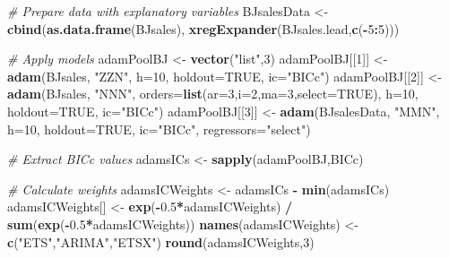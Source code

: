 \documentclass[]{book}
\newenvironment{Shaded}{\begin{snugshade}}{\end{snugshade}}
\newcommand{\CommentTok}[1]{\textcolor[rgb]{0.56,0.35,0.01}{\textit{#1}}}
\newcommand{\DataTypeTok}[1]{\textcolor[rgb]{0.13,0.29,0.53}{#1}}
\newcommand{\DecValTok}[1]{\textcolor[rgb]{0.00,0.00,0.81}{#1}}
\newcommand{\FloatTok}[1]{\textcolor[rgb]{0.00,0.00,0.81}{#1}}
\newcommand{\KeywordTok}[1]{\textcolor[rgb]{0.13,0.29,0.53}{\textbf{#1}}}
\newcommand{\NormalTok}[1]{#1}
\newcommand{\OperatorTok}[1]{\textcolor[rgb]{0.81,0.36,0.00}{\textbf{#1}}}
\newcommand{\OtherTok}[1]{\textcolor[rgb]{0.56,0.35,0.01}{#1}}
\newcommand{\StringTok}[1]{\textcolor[rgb]{0.31,0.60,0.02}{#1}}
\theoremstyle{definition}
\theoremstyle{definition}
\theoremstyle{definition}
\theoremstyle{definition}
\theoremstyle{remark}
\begin{document}
\begin{Shaded}
\begin{Highlighting}[]
\CommentTok{# Prepare data with explanatory variables}
\NormalTok{BJsalesData <-}\StringTok{ }\KeywordTok{cbind}\NormalTok{(}\KeywordTok{as.data.frame}\NormalTok{(BJsales),}
                     \KeywordTok{xregExpander}\NormalTok{(BJsales.lead,}\KeywordTok{c}\NormalTok{(}\OperatorTok{-}\DecValTok{5}\OperatorTok{:}\DecValTok{5}\NormalTok{)))}

\CommentTok{# Apply models}
\NormalTok{adamPoolBJ <-}\StringTok{ }\KeywordTok{vector}\NormalTok{(}\StringTok{"list"}\NormalTok{,}\DecValTok{3}\NormalTok{)}
\NormalTok{adamPoolBJ[[}\DecValTok{1}\NormalTok{]] <-}\StringTok{ }\KeywordTok{adam}\NormalTok{(BJsales, }\StringTok{"ZZN"}\NormalTok{,}
                        \DataTypeTok{h=}\DecValTok{10}\NormalTok{, }\DataTypeTok{holdout=}\OtherTok{TRUE}\NormalTok{,}
                        \DataTypeTok{ic=}\StringTok{"BICc"}\NormalTok{)}
\NormalTok{adamPoolBJ[[}\DecValTok{2}\NormalTok{]] <-}\StringTok{ }\KeywordTok{adam}\NormalTok{(BJsales, }\StringTok{"NNN"}\NormalTok{,}
                        \DataTypeTok{orders=}\KeywordTok{list}\NormalTok{(}\DataTypeTok{ar=}\DecValTok{3}\NormalTok{,}\DataTypeTok{i=}\DecValTok{2}\NormalTok{,}\DataTypeTok{ma=}\DecValTok{3}\NormalTok{,}\DataTypeTok{select=}\OtherTok{TRUE}\NormalTok{),}
                        \DataTypeTok{h=}\DecValTok{10}\NormalTok{, }\DataTypeTok{holdout=}\OtherTok{TRUE}\NormalTok{,}
                        \DataTypeTok{ic=}\StringTok{"BICc"}\NormalTok{)}
\NormalTok{adamPoolBJ[[}\DecValTok{3}\NormalTok{]] <-}\StringTok{ }\KeywordTok{adam}\NormalTok{(BJsalesData, }\StringTok{"MMN"}\NormalTok{,}
                        \DataTypeTok{h=}\DecValTok{10}\NormalTok{, }\DataTypeTok{holdout=}\OtherTok{TRUE}\NormalTok{,}
                        \DataTypeTok{ic=}\StringTok{"BICc"}\NormalTok{,}
                        \DataTypeTok{regressors=}\StringTok{"select"}\NormalTok{)}

\CommentTok{# Extract BICc values}
\NormalTok{adamsICs <-}\StringTok{ }\KeywordTok{sapply}\NormalTok{(adamPoolBJ,BICc)}

\CommentTok{# Calculate weights}
\NormalTok{adamsICWeights <-}\StringTok{ }\NormalTok{adamsICs }\OperatorTok{-}\StringTok{ }\KeywordTok{min}\NormalTok{(adamsICs)}
\NormalTok{adamsICWeights[] <-}\StringTok{ }\KeywordTok{exp}\NormalTok{(}\OperatorTok{-}\FloatTok{0.5}\OperatorTok{*}\NormalTok{adamsICWeights) }\OperatorTok{/}
\StringTok{                    }\KeywordTok{sum}\NormalTok{(}\KeywordTok{exp}\NormalTok{(}\OperatorTok{-}\FloatTok{0.5}\OperatorTok{*}\NormalTok{adamsICWeights))}
\KeywordTok{names}\NormalTok{(adamsICWeights) <-}\StringTok{ }\KeywordTok{c}\NormalTok{(}\StringTok{"ETS"}\NormalTok{,}\StringTok{"ARIMA"}\NormalTok{,}\StringTok{"ETSX"}\NormalTok{)}
\KeywordTok{round}\NormalTok{(adamsICWeights,}\DecValTok{3}\NormalTok{)}
\end{Highlighting}
\end{Shaded}
\end{document}
